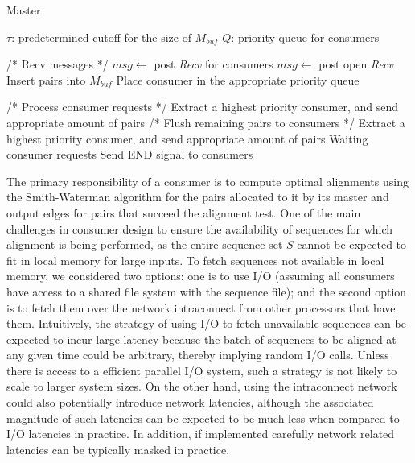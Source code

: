 \documentclass[10pt,journal,letterpaper,compsoc]{IEEEtran}
\begin{document}
\begin{algorithm}
\caption{Master}
\label{ms}
\begin{algorithmic}[1]

    \STATE $\tau$: predetermined cutoff for the size of $M_{buf}$
    \STATE $Q$: priority queue for consumers

    \WHILE{\TRUE}
        \STATE /* Recv messages */
            \STATE $msg\leftarrow$ post {\it Recv} for consumers
        \ELSE 
            \STATE $msg\leftarrow$ post open {\it Recv}
                \STATE Insert pairs into $M_{buf}$
                \ENDIF
                \STATE Place consumer in the appropriate priority queue
            \ENDIF
        \ENDIF
        
        \STATE /* Process consumer requests */
            \STATE Extract a highest priority consumer, and send appropriate amount of pairs
        \ENDWHILE
    \ENDWHILE
    \STATE /* Flush remaining pairs to consumers */
                \STATE Extract a highest priority consumer, and send appropriate amount of pairs
            \ELSE
                \STATE Waiting consumer requests
            \ENDIF
    \ENDWHILE
    \STATE Send END signal to consumers
\end{algorithmic}
\end{algorithm}



The primary responsibility of a consumer is to compute optimal alignments using the Smith-Waterman algorithm \cite{Smith81} for the pairs allocated to it by its master and output edges for pairs that succeed the alignment test. One of the main challenges in consumer design to ensure the availability of sequences for which alignment is being performed, as the entire sequence set $S$ cannot be expected to fit in local memory for large inputs. To fetch sequences not available in local memory, we considered two options: one is to use I/O (assuming all consumers have access to a shared file system with the sequence file); and the second option is to fetch them over the network intraconnect from other processors that have them. Intuitively, the strategy of using I/O to fetch unavailable sequences can be expected to incur large latency because the batch of sequences to be aligned at any given time could be arbitrary, thereby implying random I/O calls. Unless there is access to a efficient parallel I/O system, such a strategy is not likely to scale to larger system sizes. On the other hand, using the intraconnect network could also potentially introduce network latencies, although the associated magnitude of such latencies can be expected to be much less when compared to I/O latencies in practice. In addition, if implemented carefully network related latencies can be typically masked in practice. 
\end{document}
